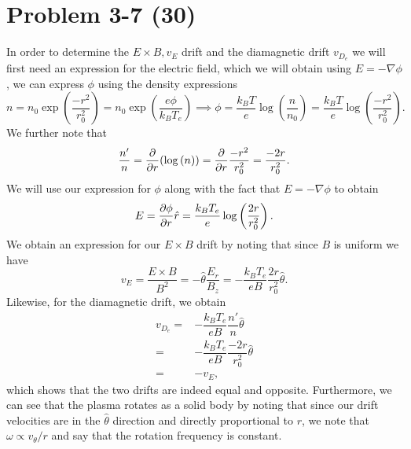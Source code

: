 \section*{Problem 3-7 (30)}
\label{sec:3-7}
In order to determine the \(E\times B, v_E \) drift and the diamagnetic drift \(v_{D_e}\) we will first need an expression for the electric field, which we will obtain using \(E = -\nabla \phi \), we can express \(\phi\) using the density expressions
\begin{equation*}
	n = n_0\exp\left(\frac{-r^2}{r_0^2} \right) = n_0\exp\left(\frac{e\phi}{k_BT_e} \right) \implies \phi = \dfrac{k_BT}{e}\log\left(\dfrac{n}{n_0}\right) = \dfrac{k_BT}{e}\log\left(\dfrac{-r^2}{r^2_0}\right).
\end{equation*}
We further note that
\begin{equation*}
	\dfrac{n'}{n} = \frac{\partial }{\partial r}(\log\left(n\right)) = \frac{\partial }{\partial r}\dfrac{-r^2}{r_0^2} = \dfrac{-2r}{r^2_0}.
\end{equation*}
We will use our expression for \(\phi\) along with the fact that \(E = -\nabla \phi \) to obtain
\begin{equation*}
	E = \frac{\partial \phi}{\partial r}\hat{r} = \dfrac{k_BT_e}{e}\log\left(\dfrac{2r}{r_0^2}\right).
\end{equation*}
We obtain an expression for our \(E\times B\) drift by noting that since \(B\) is uniform we have
\begin{equation*}
	v_E = \dfrac{E\times B}{B^2} = -\hat{\theta}\dfrac{E_r}{B_z} = -\dfrac{k_BT_e}{eB}\dfrac{2r}{r^2_0} \hat{\theta}.
\end{equation*}
Likewise, for the diamagnetic drift, we obtain
\begin{align*}
	v_{D_e} =& -\dfrac{k_BT_e}{eB}\dfrac{n'}{n}\hat{\theta}\\
	=& -\dfrac{k_BT_e}{eB}\dfrac{-2r}{r_0^2}\hat{\theta}\\
	=& -v_E,
\end{align*}
which shows that the two drifts are indeed equal and opposite. Furthermore, we can see that the plasma rotates as a solid body by noting that since our drift velocities are in the \(\hat{\theta} \) direction and directly proportional to \(r\), we note that \(\omega \propto v_\theta/r \) and say that the rotation frequency is constant.

